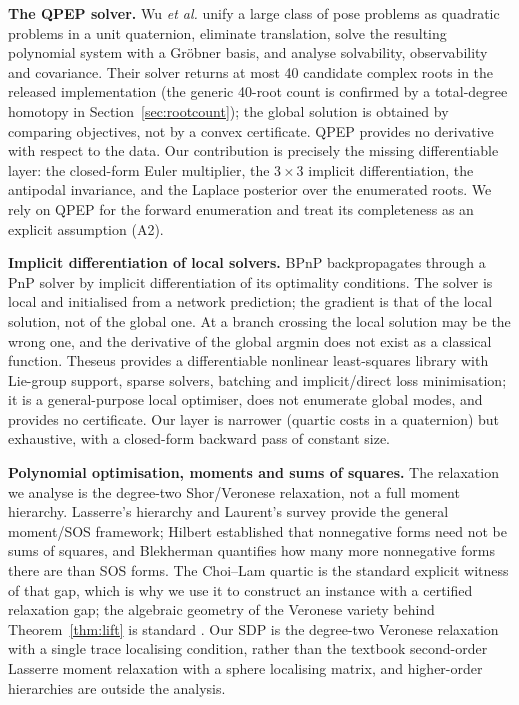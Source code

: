 \textbf{The QPEP solver.} Wu \emph{et al.} \cite{wu2022qpep} unify a large class of pose problems as quadratic problems in a unit quaternion, eliminate translation, solve the resulting polynomial system with a Gr\"obner basis, and analyse solvability, observability and covariance. Their solver returns at most 40 candidate complex roots in the released implementation (the generic 40-root count is confirmed by a total-degree homotopy in Section~\ref{sec:rootcount}); the global solution is obtained by comparing objectives, not by a convex certificate. QPEP provides no derivative with respect to the data. Our contribution is precisely the missing differentiable layer: the closed-form Euler multiplier, the $3\times3$ implicit differentiation, the antipodal invariance, and the Laplace posterior over the enumerated roots. We rely on QPEP for the forward enumeration and treat its completeness as an explicit assumption (A2).

\textbf{Implicit differentiation of local solvers.} BPnP \cite{chen2020bpn} backpropagates through a PnP solver by implicit differentiation of its optimality conditions. The solver is local and initialised from a network prediction; the gradient is that of the local solution, not of the global one. At a branch crossing the local solution may be the wrong one, and the derivative of the global argmin does not exist as a classical function. Theseus \cite{pineda2022theseus} provides a differentiable nonlinear least-squares library with Lie-group support, sparse solvers, batching and implicit/direct loss minimisation; it is a general-purpose local optimiser, does not enumerate global modes, and provides no certificate. Our layer is narrower (quartic costs in a quaternion) but exhaustive, with a closed-form backward pass of constant size.

\textbf{Polynomial optimisation, moments and sums of squares.} The relaxation we analyse is the degree-two Shor/Veronese relaxation, not a full moment hierarchy. Lasserre's hierarchy \cite{lasserre2001} and Laurent's survey \cite{laurent2009} provide the general moment/SOS framework; Hilbert \cite{hilbert1888} established that nonnegative forms need not be sums of squares, and Blekherman \cite{blekherman2006} quantifies how many more nonnegative forms there are than SOS forms. The Choi--Lam quartic \cite{choi1977extremal,choi1980zeros} is the standard explicit witness of that gap, which is why we use it to construct an instance with a certified relaxation gap; the algebraic geometry of the Veronese variety behind Theorem~\ref{thm:lift} is standard \cite{harris1992}. Our SDP is the degree-two Veronese relaxation with a single trace localising condition, rather than the textbook second-order Lasserre moment relaxation with a sphere localising matrix, and higher-order hierarchies are outside the analysis.


